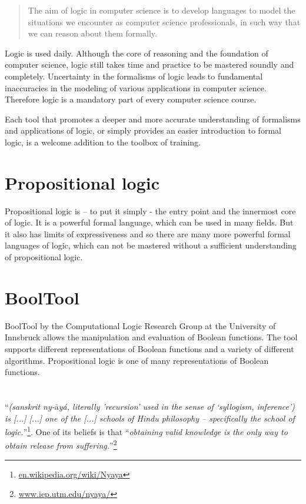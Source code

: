 
\begin{quote}
The aim of logic in computer science is to develop languages 
to model the situations we encounter as computer science professionals, 
in such way that we can reason about them formally. \cite{Huth:2004:LCS:975331}
\end{quote}

Logic is used daily. Although the core of reasoning and the foundation of computer science, 
logic still takes time and practice to be mastered soundly and completely. 
Uncertainty in the formalisms of logic leads to fundamental inaccuracies 
in the modeling of various applications in computer science. 
Therefore logic is a mandatory part of every computer science course. 

Each tool that promotes a deeper and more accurate understanding of formalisms and applications of logic,
or simply provides an easier introduction to formal logic, 
is a welcome addition to the toolbox of training.


\section{Propositional logic}

Propositional logic is – to put it simply - the entry point and the innermost core of logic. 
It is a powerful formal language, which can be used in many fields. 
But it also has limits of expressiveness and so 
there are many more powerful formal languages of logic, 
which can not be mastered without a sufficient understanding  of propositional logic.

\section{BoolTool}

BoolTool by the Computational Logic Research Group at the University of Innsbruck allows the manipulation and evaluation of Boolean functions. The tool supports different representations of Boolean functions and a variety of different algorithms.
Propositional logic is one of many representations of Boolean functions.

\section{\Nyaya}

\Nyaya{} “{\em (sanskrit ny-$\bar{\mbox{a}}$yá, literally 'recursion’  used in the sense of  ‘syllogism, inference’) is [...]
[...] one of the [...] schools of Hindu philosophy – specifically the school of logic.}”\footnote{\href{http://en.wikipedia.org/wiki/Nyaya}{ en.wikipedia.org/wiki/Nyaya}}. 
One of its beliefs is that “{\em obtaining valid knowledge is the only way  to obtain release from suffering.}”\footnote{\href{http://www.iep.utm.edu/nyaya/}{www.iep.utm.edu/nyaya/}}

